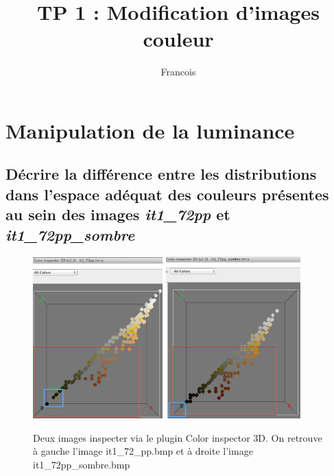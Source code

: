 \documentclass[a4paper,10pt]{article}
\title{TP 1 : Modification d'images couleur}
\author{Francois \bsc{Lepan}}
\begin{document}
\maketitle

\section{Manipulation de la luminance}

\subsection{D\'ecrire la diff\'erence entre les distributions dans l'espace ad\'equat des couleurs pr\'esentes au sein des images \emph{it1\_72pp} et \emph{it1\_72pp\_sombre}}

\begin{figure}[ht]
\begin{center}
	\includegraphics[width=5cm]{images/it1_72pp_inspector}
	\includegraphics[width=5.2cm]{images/it1_72pp_sombre_inspector}
\end{center}
	\caption{Deux images inspecter via le plugin Color inspector 3D. On retrouve \`a gauche l'image it1\_72\_pp.bmp et \`a droite l'image it1\_72pp\_sombre.bmp}
	\label{img1}
\end{figure}
\end{document}
